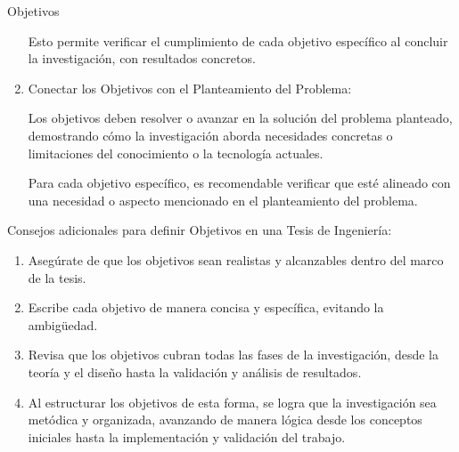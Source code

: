\documentclass[9pt]{beamer}
\begin{document}
\begin{frame}{Objetivos}
\begin{enumerate}
    Esto permite verificar el cumplimiento de cada objetivo específico al concluir la investigación, con resultados concretos.

    \item Conectar los Objetivos con el Planteamiento del Problema:

    Los objetivos deben resolver o avanzar en la solución del problema planteado, demostrando cómo la investigación aborda necesidades concretas o limitaciones del conocimiento o la tecnología actuales.

    Para cada objetivo específico, es recomendable verificar que esté alineado con una necesidad o aspecto mencionado en el planteamiento del problema.
\end{enumerate}

Consejos adicionales para definir Objetivos en una Tesis de Ingeniería:

\begin{enumerate}
    \item Asegúrate de que los objetivos sean realistas y alcanzables dentro del marco de la tesis.
    \item Escribe cada objetivo de manera concisa y específica, evitando la ambigüedad.
    \item Revisa que los objetivos cubran todas las fases de la investigación, desde la teoría y el diseño hasta la validación y análisis de resultados.
    \item Al estructurar los objetivos de esta forma, se logra que la investigación sea metódica y organizada, avanzando de manera lógica desde los conceptos iniciales hasta la implementación y validación del trabajo.
\end{enumerate}    
\end{frame}
\end{document}
